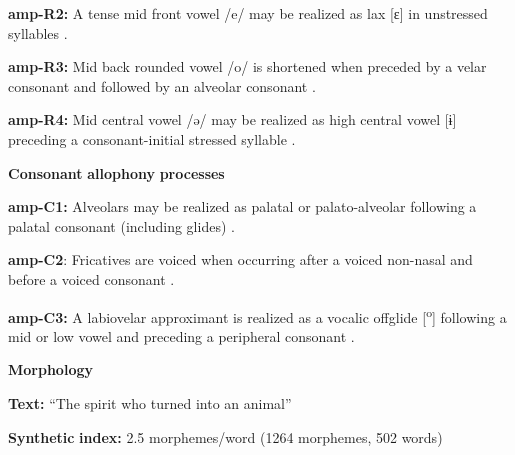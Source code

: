 \documentclass[output=paper]{langsci/langscibook}
\begin{document}
\begin{styleBody}
\textbf{amp-R2:} A tense mid front vowel /e/ may be realized as lax [ɛ] in unstressed syllables \citep[38]{Bruce1984}.
\end{styleBody}

\begin{styleBody}
\textbf{amp-R3:} Mid back rounded vowel /o/ is shortened when preceded by a velar consonant and followed by an alveolar consonant \citep[39]{Bruce1984}.
\end{styleBody}

\begin{styleBody}
\textbf{amp-R4:} Mid central vowel /ə/ may be realized as high central vowel [ɨ] preceding a consonant-initial stressed syllable \citep[41]{Bruce1984}.
\end{styleBody}

\begin{styleBody}
\textbf{Consonant} \textbf{allophony} \textbf{processes}
\end{styleBody}

\begin{styleBody}
\textbf{amp-C1:} Alveolars may be realized as palatal or palato-alveolar following a palatal consonant (including glides) \citep[29]{Bruce1984}.
\end{styleBody}

\begin{styleBody}
\textbf{amp-C2}: Fricatives are voiced when occurring after a voiced non-nasal and before a voiced consonant \citep[25]{Bruce1984}.
\end{styleBody}

\begin{styleBody}
\textbf{amp-C3:} A labiovelar approximant is realized as a vocalic offglide [\textsuperscript{o}] following a mid or low vowel and preceding a peripheral consonant \citep[28]{Bruce1984}.
\end{styleBody}

\begin{styleBody}
\textbf{Morphology}
\end{styleBody}

\begin{styleBody}
\textbf{Text:} “The spirit who turned into an animal” \citep[323-331]{Bruce1984}
\end{styleBody}

\begin{styleBody}
\textbf{Synthetic} \textbf{index:} 2.5 morphemes/word (1264 morphemes, 502 words)
\end{styleBody}
\end{document}
